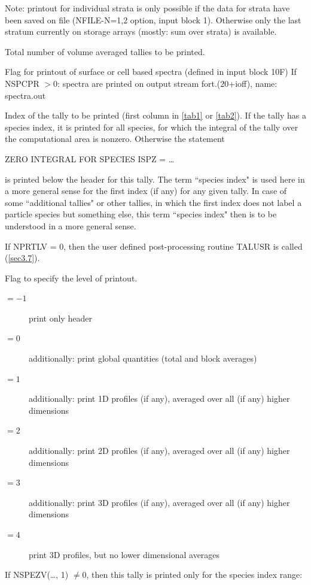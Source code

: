 \begin{description}
        Note: printout for individual strata is only possible if the data for strata
        have been saved on file (NFILE-N=1,2 option, input block 1).
        Otherwise only the last stratum currently on storage arrays (mostly:
        sum over strata) is available.
  \item[NVOLPR] Total number of volume averaged tallies to be printed.
  \item[NSPCPR] Flag for printout of surface or cell based spectra (defined in
        input block 10F) If NSPCPR $> 0$: spectra are printed on output stream 
        fort.(20+ioff), name: spectra.out
  \item[NPRTLV] Index of the tally to be printed
        (first column in \cref{tab1} or \cref{tab2}).
        If the tally has a species index, it is printed for all species, for which the
        integral of the tally over the computational area is nonzero.
        Otherwise the statement 

        ZERO INTEGRAL FOR SPECIES ISPZ = \dots 

        is printed below the header for this tally.
        The term ``species index" is used here in a more general sense	for the first
        index (if any) for any given tally.
        In case of some ``additional tallies" or other tallies, in which the first
        index does not label a particle species but something else, this term ``species
        index" then is to be understood in a more general sense.

        If NPRTLV = 0, then the user defined post-processing routine TALUSR is called
        (\cref{sec3.7}).
  \item[NFLAGV] Flag to specify the level of printout.
        \begin{description}
          \item[$=-1$] print only header
          \item[$=0$] additionally: print global
                quantities (total and block averages)
          \item[$=1$] additionally: print 1D
                profiles (if any), averaged over all (if any) higher dimensions
          \item[$=2$]
                additionally: print 2D profiles (if any), averaged over all (if any) higher
                dimensions
          \item[$=3$] additionally: print 3D profiles (if any), averaged over
                all (if any) higher dimensions
          \item[$=4$] print 3D profiles, but no lower
                dimensional averages
        \end{description}
  \item[NSPEZV] If NSPEZV(\dots, 1) $\ne
          0$, then this tally is printed only for the species index range:


\end{description}
